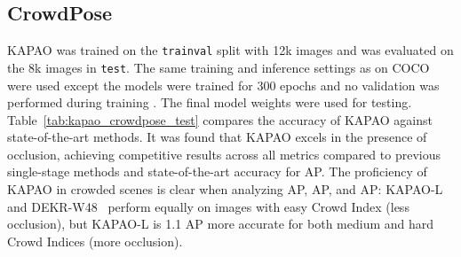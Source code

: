 \documentclass[runningheads]{llncs}
\newcommand\hll[1]{\bgroup
  \hskip0pt\color{black}#1\egroup
}
\newcommand\hlll[1]{\bgroup
  \hskip0pt\color{black}#1\egroup
}
\begin{document}
\subsection{CrowdPose}
\label{sec:kapao_crowdpose}
KAPAO was trained on the \texttt{trainval} split with 12k images and was evaluated on the 8k images in \texttt{test}. The same training and inference settings as on COCO were used except the models were trained for 300 epochs and no validation was performed \hlll{during training}. The final model weights were used for testing. Table~\ref{tab:kapao_crowdpose_test} compares the accuracy of KAPAO against state-of-the-art methods. It was found that KAPAO excels in the presence of occlusion, \hll{achieving competitive results across all metrics compared to previous single-stage methods and state-of-the-art accuracy for AP.} The proficiency of KAPAO in crowded scenes is clear when analyzing AP, AP, and AP: KAPAO-L and DEKR-W48~\cite{geng2021bottom} perform equally on images with easy Crowd Index (less occlusion), but KAPAO-L is 1.1 AP more accurate for both medium and hard Crowd Indices (more occlusion). 
\end{document}
